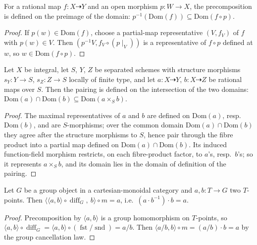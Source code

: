 \begin{lemma}\leanok
  \label{lem:rationalMap_precomp_domain_bound}
  For a rational map \(f \colon X \dashrightarrow Y\) and an open morphism
  \(p \colon W \to X\), the precomposition is defined on the preimage of the domain:
  \(p^{-1}(\mathrm{Dom}(f)) \subseteq \mathrm{Dom}(f \circ p)\).
\end{lemma}
\begin{proof}\leanok
  If \(p(w) \in \mathrm{Dom}(f)\), choose a partial-map representative \((V, f_V)\) of
  \(f\) with \(p(w) \in V\). Then \((p^{-1}V, f_V \circ (p \mid_V))\) is a representative
  of \(f \circ p\) defined at \(w\), so \(w \in \mathrm{Dom}(f \circ p)\).
\end{proof}

\begin{lemma}\leanok
  \label{lem:rationalMap_prod_domain_bound}
  Let \(X\) be integral, let \(S\), \(Y\), \(Z\) be separated schemes with structure
  morphisms \(s_Y \colon Y \to S\), \(s_Z \colon Z \to S\) locally of finite type, and let
  \(a \colon X \dashrightarrow Y\), \(b \colon X \dashrightarrow Z\) be rational maps over
  \(S\). Then the pairing is defined on the intersection of the two domains:
  \(\mathrm{Dom}(a) \cap \mathrm{Dom}(b) \subseteq \mathrm{Dom}(a \times_S b)\).
\end{lemma}
\begin{proof}\leanok
  The maximal representatives of \(a\) and \(b\) are defined on \(\mathrm{Dom}(a)\),
  resp.\ \(\mathrm{Dom}(b)\), and are \(S\)-morphisms; over the common domain
  \(\mathrm{Dom}(a) \cap \mathrm{Dom}(b)\) they agree after the structure morphisms to
  \(S\), hence pair through the fibre product into a partial map defined on
  \(\mathrm{Dom}(a) \cap \mathrm{Dom}(b)\). Its induced function-field morphism restricts,
  on each fibre-product factor, to \(a\)'s, resp.\ \(b\)'s; so it represents \(a \times_S
  b\), and its domain lies in the domain of definition of the pairing.
\end{proof}

\begin{lemma}\leanok
  \label{lem:grpObj_reconstruction}
  Let \(G\) be a group object in a cartesian-monoidal category and \(a, b \colon T \to G\)
  two \(T\)-points. Then
  \(\bigl\langle \langle a, b\rangle \circ \operatorname{diff}_G,\ b \bigr\rangle \circ m
  = a\), i.e.\ \((a \cdot b^{-1}) \cdot b = a\).
\end{lemma}
\begin{proof}\leanok
  Precomposition by \(\langle a, b\rangle\) is a group homomorphism on \(T\)-points, so
  \(\langle a, b\rangle \circ \operatorname{diff}_G = \langle a, b\rangle \circ
  (\operatorname{fst} / \operatorname{snd}) = a / b\). Then \(\langle a/b, b\rangle \circ m
  = (a/b) \cdot b = a\) by the group cancellation law.
\end{proof}

